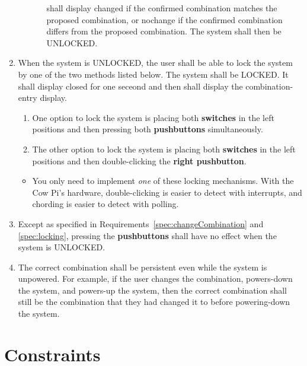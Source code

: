 \begin{enumerate}
\begin{enumerate}
\begin{enumerate}
            shall display {\dviiseg changed} if the confirmed
            combination matches the proposed combination, or {\dviiseg nochange}
            if the confirmed combination differs from the proposed
            combination. The system shall then be UNLOCKED.
        \end{enumerate}
    \end{enumerate}
\item \label{spec:locking} When the system is UNLOCKED, the user shall be able
    to lock the system by one of the two methods listed below. The system shall
    be LOCKED. It shall display {\dviiseg closed} for one seceond and then shall
    display the combination-entry display.
    \begin{enumerate}
    \item One option to lock the system is placing both \textbf{switches} in the
        left positions and then pressing both \textbf{pushbuttons}
        simultaneously.
    \item The other option to lock the system is placing both \textbf{switches}
        in the left positions and then double-clicking the \textbf{right
        pushbutton}.
    \end{enumerate}
    \begin{itemize}
    \item You only need to implement \textit{one} of these locking mechanisms.
        With the Cow Pi's hardware, double-clicking is easier to detect with
        interrupts, and chording is easier to detect with polling.
    \end{itemize}
\item Except as specified in Requirements~\ref{spec:changeCombination} and
    \ref{spec:locking}, pressing the \textbf{pushbuttons} shall have no effect
    when the system is UNLOCKED.
\item \label{spec:persistentCombination} The correct combination shall be
    persistent even while the system is unpowered. For example, if the user
    changes the combination, powers-down the system, and powers-up the system,
    then the correct combination shall still be the combination that they had
    changed it to before powering-down the system.
\end{enumerate}

\section{Constraints}\label{sec:Constraints}

